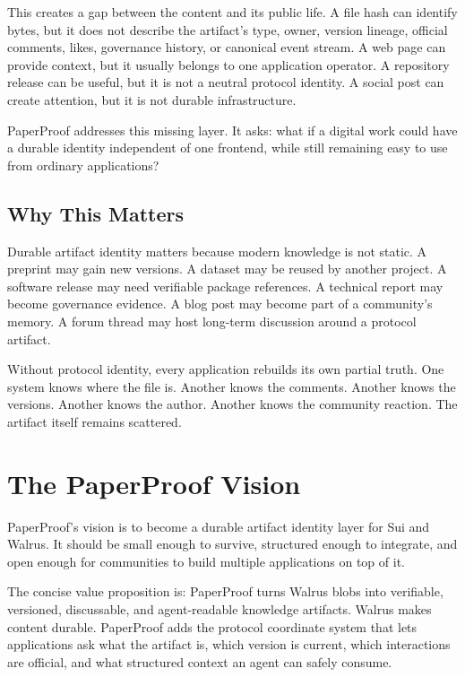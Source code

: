 \documentclass[11pt]{article}
\begin{document}
This creates a gap between the content and its public life. A file hash can
identify bytes, but it does not describe the artifact's type, owner, version
lineage, official comments, likes, governance history, or canonical event stream.
A web page can provide context, but it usually belongs to one application
operator. A repository release can be useful, but it is not a neutral protocol
identity. A social post can create attention, but it is not durable
infrastructure.

PaperProof addresses this missing layer. It asks: what if a digital work could
have a durable identity independent of one frontend, while still remaining easy
to use from ordinary applications?

\subsection{Why This Matters}

Durable artifact identity matters because modern knowledge is not static. A
preprint may gain new versions. A dataset may be reused by another project. A
software release may need verifiable package references. A technical report may
become governance evidence. A blog post may become part of a community's memory.
A forum thread may host long-term discussion around a protocol artifact.

Without protocol identity, every application rebuilds its own partial truth. One
system knows where the file is. Another knows the comments. Another knows the
versions. Another knows the author. Another knows the community reaction. The
artifact itself remains scattered.

\section{The PaperProof Vision}

PaperProof's vision is to become a durable artifact identity layer for Sui and
Walrus. It should be small enough to survive, structured enough to integrate,
and open enough for communities to build multiple applications on top of it.

The concise value proposition is: PaperProof turns Walrus blobs into
verifiable, versioned, discussable, and agent-readable knowledge artifacts.
Walrus makes content durable. PaperProof adds the protocol coordinate system
that lets applications ask what the artifact is, which version is current,
which interactions are official, and what structured context an agent can
safely consume.
\end{document}
